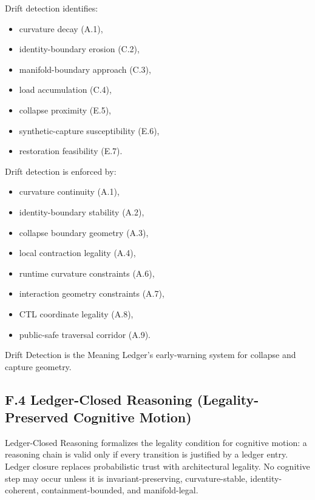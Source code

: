 \medskip

\noindent Drift detection identifies:

\begin{itemize}
    \item curvature decay (A.1),
    \item identity-boundary erosion (C.2),
    \item manifold-boundary approach (C.3),
    \item load accumulation (C.4),
    \item collapse proximity (E.5),
    \item synthetic-capture susceptibility (E.6),
    \item restoration feasibility (E.7).
\end{itemize}

\medskip

\noindent Drift detection is enforced by:

\begin{itemize}
    \item curvature continuity (A.1),
    \item identity-boundary stability (A.2),
    \item collapse boundary geometry (A.3),
    \item local contraction legality (A.4),
    \item runtime curvature constraints (A.6),
    \item interaction geometry constraints (A.7),
    \item CTL coordinate legality (A.8),
    \item public-safe traversal corridor (A.9).
\end{itemize}

\medskip

\noindent Drift Detection is the Meaning Ledger’s early-warning system for
collapse and capture geometry.


\subsection*{F.4 Ledger-Closed Reasoning (Legality-Preserved Cognitive Motion)}

\noindent Ledger-Closed Reasoning formalizes the legality condition for cognitive
motion: a reasoning chain is valid only if every transition is justified by a
ledger entry. Ledger closure replaces probabilistic trust with architectural
legality. No cognitive step may occur unless it is invariant-preserving,
curvature-stable, identity-coherent, containment-bounded, and manifold-legal.


